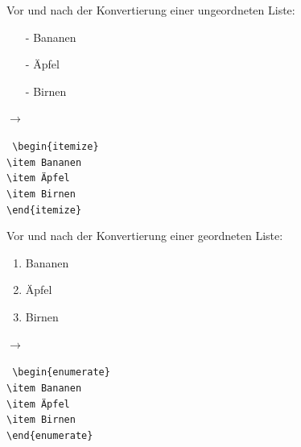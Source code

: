             \begin{figure}[H]

            Vor und nach der Konvertierung einer ungeordneten Liste: \\[5mm]
            \begin{minipage}[c]{0.45\textwidth}
                \begin{itemize}
                    \item[-] Bananen
                    \item[-] Äpfel
                    \item[-] Birnen
                \end{itemize}
            \end{minipage}
            \begin{minipage}[c]{0.1\textwidth}
                $\longrightarrow$
            \end{minipage}
            \begin{minipage}[c]{0.45\textwidth}
                \texttt{\noindent
                    \textbackslash{}begin\{itemize\} \\
                    \textbackslash{}item Bananen \\
                    \textbackslash{}item Äpfel \\
                    \textbackslash{}item Birnen \\
                    \textbackslash{}end\{itemize\}
                }
            \end{minipage}

            Vor und nach der Konvertierung einer geordneten Liste: \\[5mm]
            \begin{minipage}[c]{0.45\textwidth}
                \begin{enumerate}
                    \item Bananen
                    \item Äpfel
                    \item Birnen
                \end{enumerate}
            \end{minipage}
            \begin{minipage}[c]{0.1\textwidth}
                $\longrightarrow$
            \end{minipage}
            \begin{minipage}[c]{0.45\textwidth}
                \texttt{\noindent
                    \textbackslash{}begin\{enumerate\} \\
                    \textbackslash{}item Bananen \\
                    \textbackslash{}item Äpfel \\
                    \textbackslash{}item Birnen \\
                \textbackslash{}end\{enumerate\}
                }
            \end{minipage}
            \end{figure}


